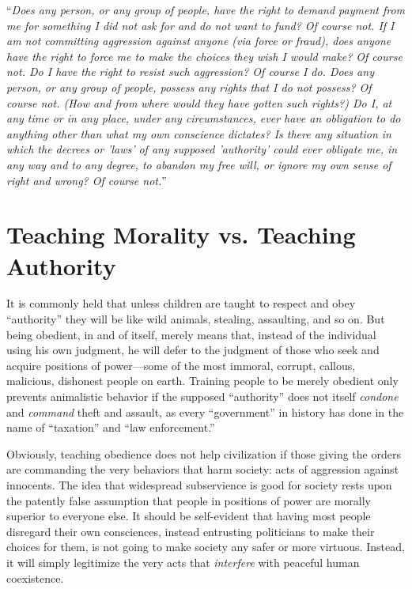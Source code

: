 \documentclass{book}
\begin{document}
\enquote{\emph{Does any person, or any group of people, have the right to demand payment from me for something I did not ask for and do not want to fund? Of course not. If I am not committing aggression against anyone (via force or fraud), does anyone have the right to force me to make the choices they wish I would make? Of course not. Do I have the right to resist such aggression? Of course I do. Does any person, or any group of people, possess any rights that I do not possess? Of course not. (How and from where would they have gotten such rights?) Do I, at any time or in any place, under any circumstances, ever have an obligation to do anything other than what my own conscience dictates? Is there any situation in which the decrees or 'laws' of any supposed 'authority' could ever obligate me, in any way and to any degree, to abandon my free will, or ignore my own sense of right and wrong? Of course not.}}

\section{Teaching Morality vs. Teaching Authority}

It is commonly held that unless children are taught to respect and obey \enquote{authority} they will be like wild animals, stealing, assaulting, and so on. But being obedient, in and of itself, merely means that, instead of the individual using his own judgment, he will defer to the judgment of those who seek and acquire positions of power---some of the most immoral, corrupt, callous, malicious, dishonest people on earth. Training people to be merely obedient only prevents animalistic behavior if the supposed \enquote{authority} does not itself \emph{condone} and \emph{command} theft and assault, as every \enquote{government} in history has done in the name of \enquote{taxation} and \enquote{law enforcement.}

Obviously, teaching obedience does not help civilization if those giving the orders are commanding the very behaviors that harm society: acts of aggression against innocents. The idea that widespread subservience is good for society rests upon the patently false assumption that people in positions of power are morally superior to everyone else. It should be self-evident that having most people disregard their own consciences, instead entrusting politicians to make their choices for them, is not going to make society any safer or more virtuous. Instead, it will simply legitimize the very acts that \emph{interfere} with peaceful human coexistence.
\end{document}
